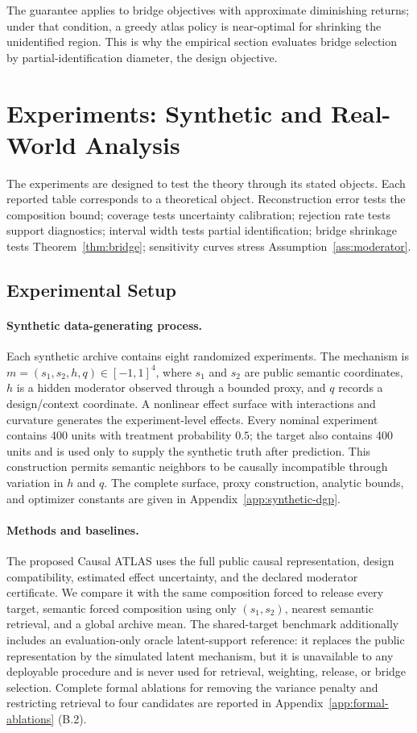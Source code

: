\documentclass[11pt]{article}
\numberwithin{equation}{section}
\newcommand{\1}{\mathbf 1}
\begin{document}
The guarantee applies to bridge objectives with approximate diminishing returns; under that condition, a greedy atlas policy is near-optimal for shrinking the unidentified region.  This is why the empirical section evaluates bridge selection by partial-identification diameter, the design objective.

\section{Experiments: Synthetic and Real-World Analysis}
\label{sec:experiments}

The experiments are designed to test the theory through its stated objects.  Each reported table corresponds to a theoretical object.  Reconstruction error tests the composition bound; coverage tests uncertainty calibration; rejection rate tests support diagnostics; interval width tests partial identification; bridge shrinkage tests Theorem~\ref{thm:bridge}; sensitivity curves stress Assumption~\ref{ass:moderator}.

\subsection{Experimental Setup}
\paragraph{Synthetic data-generating process.}
Each synthetic archive contains eight randomized experiments.  The mechanism is $m=(s_1,s_2,h,q)\in[-1,1]^4$, where $s_1$ and $s_2$ are public semantic coordinates, $h$ is a hidden moderator observed through a bounded proxy, and $q$ records a design/context coordinate.  A nonlinear effect surface with interactions and curvature generates the experiment-level effects.  Every nominal experiment contains 400 units with treatment probability $0.5$; the target also contains 400 units and is used only to supply the synthetic truth after prediction.  This construction permits semantic neighbors to be causally incompatible through variation in $h$ and $q$.  The complete surface, proxy construction, analytic bounds, and optimizer constants are given in 
Appendix~\ref{app:synthetic-dgp}.
\paragraph{Methods and baselines.}
The proposed Causal ATLAS uses the full public causal representation, design compatibility, estimated effect uncertainty, and the declared moderator certificate.  We compare it with the same composition forced to release every target, semantic forced composition using only $(s_1,s_2)$, nearest semantic retrieval, and a global archive mean.  The shared-target benchmark additionally includes an evaluation-only oracle latent-support reference: it replaces the public representation by the simulated latent mechanism, but it is unavailable to any deployable procedure and is never used for retrieval, weighting, release, or bridge selection.  Complete formal ablations for removing the variance penalty and restricting retrieval to four candidates are reported in Appendix~\ref{app:formal-ablations} (B.2).
\end{document}
